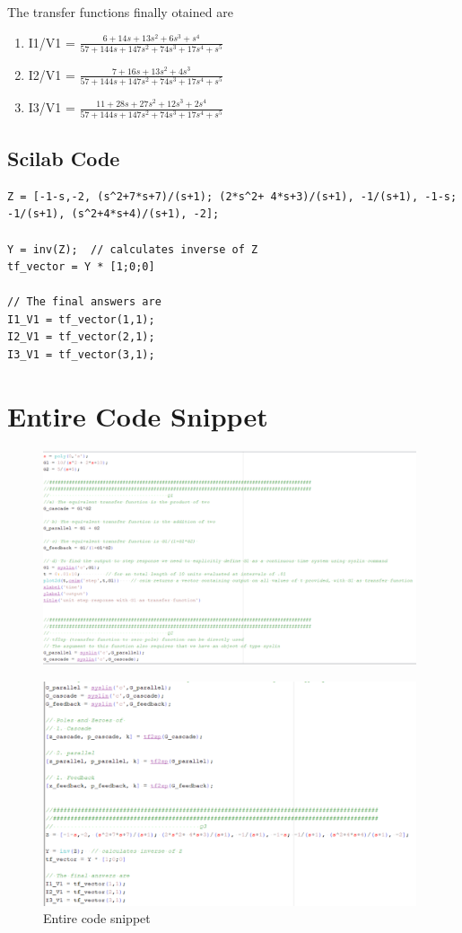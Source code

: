 \documentclass[10pt]{article}
\begin{document}
The transfer functions finally otained are\\
 \begin{enumerate}
     \item I1/V1 = $\frac{6+14s+13s^2+6s^3+s^4}{57 + 144s + 147s^2 + 74s^3 + 17s^4 + s^5}$\\
     \item I2/V1 = $\frac{7+16s+13s^2+4s^3}{57 + 144s + 147s^2 + 74s^3 + 17s^4 + s^5}$\\
     \item I3/V1 = $\frac{11+28s+27s^2+12s^3+2s^4}{57 + 144s + 147s^2 + 74s^3 + 17s^4 + s^5}$\\
 \end{enumerate}
\subsection*{Scilab Code}
\begin{verbatim}
Z = [-1-s,-2, (s^2+7*s+7)/(s+1); (2*s^2+ 4*s+3)/(s+1), -1/(s+1), -1-s; -1/(s+1), (s^2+4*s+4)/(s+1), -2];

Y = inv(Z);  // calculates inverse of Z
tf_vector = Y * [1;0;0]

// The final answers are
I1_V1 = tf_vector(1,1);
I2_V1 = tf_vector(2,1);
I3_V1 = tf_vector(3,1);
\end{verbatim}

\section*{Entire Code Snippet}
\begin{figure}[H]
    \centering
    \includegraphics[width=0.98\textwidth]{snippet1.png}
\end{figure}
\begin{figure}[H]
    \centering
    \includegraphics[width=0.98\textwidth]{snippet2.png}
    \caption{Entire  code snippet}
\end{figure}
\end{document}
